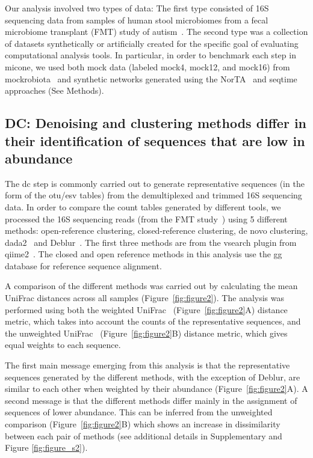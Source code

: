 \documentclass[letterpaper,12pt]{article}
\begin{document}
  Our analysis involved two types of data: The first type consisted of 16S sequencing data from samples of human stool microbiomes from a fecal microbiome transplant (FMT) study of autism~\cite{Kang2017}.
  The second type was a collection of datasets synthetically or artificially created for the specific goal of evaluating computational analysis tools.
  In particular, in order to benchmark each step in \ac{micone}, we used both mock data (labeled mock4, mock12, and mock16) from mockrobiota~\cite{Bokulich2016} and synthetic networks generated using the NorTA~\cite{Kurtz2015} and seqtime~\cite{Rottjers2018} approaches (See Methods).

  \FloatBarrier

  \subsection*{DC: Denoising and clustering methods differ in their identification of sequences that are low in abundance}

  The \ac{dc} step is commonly carried out to generate representative sequences (in the form of the \acs{otu}/\acs{esv} tables) from the demultiplexed and trimmed 16S sequencing data.
  In order to compare the count tables generated by different tools, we processed the 16S sequencing reads (from the FMT study~\cite{Kang2017}) using 5 different methods: open-reference clustering, closed-reference clustering, de novo clustering, \ac{dada2}~\cite{Callahan2016} and Deblur~\cite{Amir2017}.
  The first three methods are from the vsearch plugin from \ac{qiime2}~\cite{bolyenReproducibleInteractiveScalable2019}.
  The closed and open reference methods in this analysis use the \acl{gg}~\cite{DeSantis2006} database for reference sequence alignment.

  A comparison of the different methods was carried out by calculating the mean UniFrac distances across all samples (Figure~\ref{fig:figure2}).
  The analysis was performed using both the weighted UniFrac~\cite{Lozupone2007} (Figure~\ref{fig:figure2}A) distance metric, which takes into account the counts of the representative sequences, and the unweighted UniFrac~\cite{Lozupone2005} (Figure~\ref{fig:figure2}B) distance metric, which gives equal weights to each sequence.

  The first main message emerging from this analysis is that the representative sequences generated by the different methods, with the exception of Deblur, are similar to each other when weighted by their abundance (Figure~\ref{fig:figure2}A).
  A second message is that the different methods differ mainly in the assignment of sequences of lower abundance.
  This can be inferred from the unweighted comparison (Figure~\ref{fig:figure2}B) which shows an increase in dissimilarity between each pair of methods (see additional details in Supplementary and Figure \ref{fig:figure_s2}).
\end{document}

